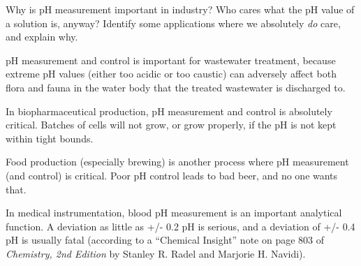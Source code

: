 

Why is pH measurement important in industry?  Who cares what the pH value of a solution is, anyway?  Identify some applications where we absolutely {\it do} care, and explain why.







pH measurement and control is important for wastewater treatment, because extreme pH values (either too acidic or too caustic) can adversely affect both flora and fauna in the water body that the treated wastewater is discharged to.   

\vskip 10pt

In biopharmaceutical production, pH measurement and control is absolutely critical.  Batches of cells will not grow, or grow properly, if the pH is not kept within tight bounds.

\vskip 10pt

Food production (especially brewing) is another process where pH measurement (and control) is critical.  Poor pH control leads to bad beer, and no one wants that.







In medical instrumentation, blood pH measurement is an important analytical function.  A deviation as little as +/- 0.2 pH is serious, and a deviation of +/- 0.4 pH is usually fatal (according to a ``Chemical Insight'' note on page 803 of {\it Chemistry, 2nd Edition} by Stanley R. Radel and Marjorie H. Navidi).




